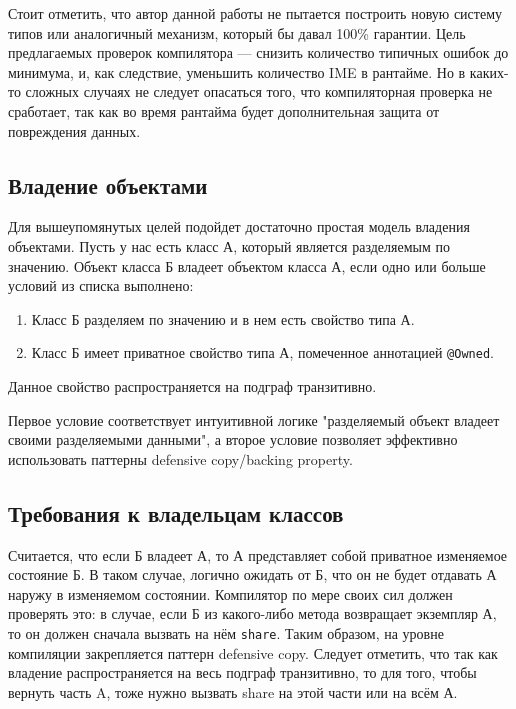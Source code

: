 \documentclass[specification,annotation,times]{itmo-student-thesis}
\begin{document}
Стоит отметить, что автор данной работы не пытается построить новую систему типов или аналогичный механизм, который бы давал 100\% гарантии.
Цель предлагаемых проверок компилятора --- снизить количество типичных ошибок до минимума, и, как следствие, уменьшить количество IME в рантайме.
Но в каких-то сложных случаях не следует опасаться того, что компиляторная проверка не сработает,
так как во время рантайма будет дополнительная защита от повреждения данных.

\subsection{Владение объектами}

Для вышеупомянутых целей подойдет достаточно простая модель владения объектами. Пусть у нас есть класс А, который является разделяемым по значению.
Объект класса Б владеет объектом класса А, если одно или больше условий из списка выполнено:

\begin{enumerate}
	\item Класс Б разделяем по значению и в нем есть свойство типа А. %
	\item Класс Б имеет приватное свойство типа А, помеченное аннотацией \texttt{@Owned}.
\end{enumerate}

Данное свойство распространяется на подграф транзитивно.

Первое условие соответствует интуитивной логике "разделяемый объект владеет своими разделяемыми данными", а второе условие позволяет эффективно использовать паттерны defensive copy/backing property.

\subsection{Требования к владельцам классов}

Считается, что если Б владеет А, то А представляет собой приватное изменяемое состояние Б.
В таком случае, логично ожидать от Б, что он не будет отдавать А наружу в изменяемом состоянии.
Компилятор по мере своих сил должен проверять это: в случае, если Б из какого-либо метода возвращает экземпляр А, то он должен сначала вызвать на нём \texttt{share}.
Таким образом, на уровне компиляции закрепляется паттерн defensive copy.
Следует отметить, что так как владение распространяется на весь подграф транзитивно, то для того, чтобы вернуть часть A, тоже нужно вызвать share на этой части или на всём А.
\end{document}
